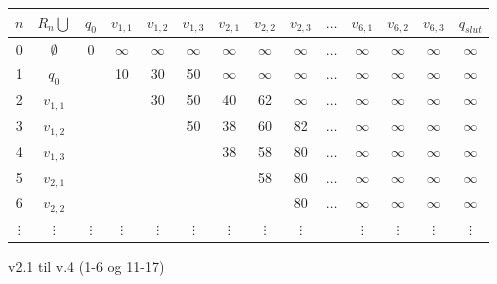 
\begin{tabular}{|c|c|c|c|c|c|c|c|c|c|c|c|c|c|} 
\hline
$n$ & $R_{n} \bigcup$ & $q_{0}$ & $v_{1,1}$ & $v_{1,2}$ & $v_{1,3}$ & $v_{2,1}$ & $v_{2,2}$ & $v_{2,3}$ & $\ldots$ & $v_{6,1}$ & $v_{6,2}$ & $v_{6,3}$ & $q_{slut}$ \\
\hline
0 & $\emptyset$ & 0 & $\infty$ & $\infty$ & $\infty$ & $\infty$ & $\infty$ & $\infty$ & $\ldots$ & $\infty$ & $\infty$ & $\infty$ & $\infty$ \\ 
1 & $q_{0}$ & & 10 & 30 & 50 & $\infty$ & $\infty$ & $\infty$ & $\ldots$ & $\infty$ & $\infty$ & $\infty$ & $\infty$\\ 
2 & $v_{1,1}$ & & & 30 & 50 & 40 & 62 & $\infty$ & $\ldots$ & $\infty$ & $\infty$ & $\infty$ & $\infty$\\ 
3 & $v_{1,2}$ & & & & 50 & 38 & 60 & 82 & $\ldots$ & $\infty$ & $\infty$ & $\infty$ & $\infty$\\
4 & $v_{1,3}$ & & & & & 38 & 58 & 80 & $\ldots$ & $\infty$ & $\infty$ & $\infty$ & $\infty$\\ 
5 & $v_{2,1}$ & & & & & & 58 & 80 & $\ldots$ & $\infty$ & $\infty$ & $\infty$ & $\infty$\\ 
6 & $v_{2,2}$ & & & & & & & 80 & $\ldots$ & $\infty$ & $\infty$ & $\infty$ & $\infty$\\  
$\vdots$ & $\vdots$ & $\vdots$ & $\vdots$ & $\vdots$ & $\vdots$ & $\vdots$ & $\vdots$ & $\vdots$ &  & $\vdots$ & $\vdots$ & $\vdots$ & $\vdots$\\ 
\hline
\end{tabular}

v2.1 til v.4
(1-6 og 11-17)